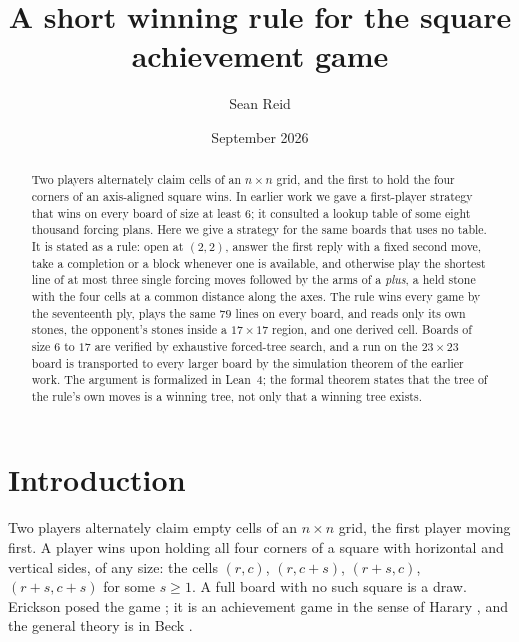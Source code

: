 \documentclass[11pt]{amsart}
\title{A short winning rule for the square achievement game}
\author{Sean Reid}
\date{September 2026}
\theoremstyle{definition}
\theoremstyle{remark}
\begin{document}
\begin{abstract}
Two players alternately claim cells of an $n \times n$ grid, and the
first to hold the four corners of an axis-aligned square wins. In
earlier work we gave a first-player strategy that wins on every board of
size at least $6$; it consulted a lookup table of some eight thousand
forcing plans. Here we give a strategy for the same boards that uses no
table. It is stated as a rule: open at $(2,2)$, answer the first reply
with a fixed second move, take a completion or a block whenever one is
available, and otherwise play the shortest line of at most three single
forcing moves followed by the arms of a \emph{plus}, a held stone with
the four cells at a common distance along the axes. The rule wins every
game by the seventeenth ply, plays the same $79$ lines on every board,
and reads only its own stones, the opponent's stones inside a $17 \times
17$ region, and one derived cell. Boards of size $6$ to $17$ are
verified by exhaustive forced-tree search, and a run on the $23 \times
23$ board is transported to every larger board by the simulation theorem
of the earlier work. The argument is formalized in Lean~4; the formal
theorem states that the tree of the rule's own moves is a winning tree,
not only that a winning tree exists.
\end{abstract}

\maketitle

\section{Introduction}\label{sec:intro}

Two players alternately claim empty cells of an $n \times n$ grid,
the first player moving first. A player wins upon holding all four
corners of a square with horizontal and vertical sides, of any size:
the cells $(r,c)$, $(r,c+s)$, $(r+s,c)$, $(r+s,c+s)$ for some
$s \ge 1$. A full board with no such square is a draw. Erickson posed
the game \cite{erickson-pearls, opg}; it is an achievement game in
the sense of Harary \cite{harary}, and the general theory is in Beck
\cite{beck}.
\end{document}
